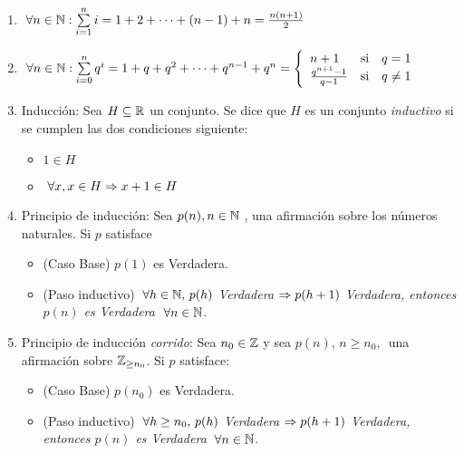 \begin{enumerate}
	\item $\paratodo n \en \naturales: \sumatoria{i = 1}{n} i =  1 + 2 + \cdots + (n-1) + n = \frac{n(n+1)}{2}$

	\item $\paratodo n \en \naturales: \sumatoria{i = 0}{n} q^i =
		      1 + q + q^2 + \cdots  + q^{n-1} + q^n =
		      \llave{lll}{
			      n+1 & \text{si} & q = 1\\
			      \frac{q^{n+1}-1}{q-1} & \text{si} & q \distinto 1\\
		      }$

	\item Inducción: Sea $H \subseteq \reales$ un conjunto. Se dice que $H$ es un conjunto \textit{inductivo} si se cumplen las dos condiciones siguiente:
	      \begin{itemize}
		      \item $1 \in H$
		      \item $\paratodo x , x \in H \entonces x+1 \en H$
	      \end{itemize}

	\item Principio de inducción: Sea $p(n), n \in \naturales$ , una afirmación sobre los números naturales.
	      Si $p$ satisface
	      \begin{itemize}
		      \item (Caso Base) $p(1)$ es Verdadera.
		      \item (Paso inductivo) $\paratodo h \en \naturales,\, p(h)$ \textit{Verdadera}
		            $\entonces p(h+1)$ \textit{Verdadera, entonces $p(n)$ es Verdadera} $\paratodo n \en \naturales$.
	      \end{itemize}

	\item Principio de inducción \textit{corrido}: Sea $n_0 \en \enteros$ y sea $p(n),\, n\geq n_0,\,$ una afirmación sobre $\enteros_{\geq n_0}$. Si $p$
	      satisface:
	      \begin{itemize}
		      \item (Caso Base) $p(n_0)$ es Verdadera.
		      \item (Paso inductivo) $\paratodo h \geq n_0,\, p(h)$ \textit{Verdadera}
		            $\entonces p(h+1)$ \textit{Verdadera, entonces $p(n)$ es Verdadera} $\paratodo n \en \naturales$.
	      \end{itemize}
\end{enumerate}

